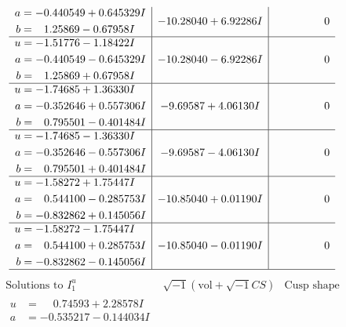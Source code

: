 \documentclass[1p]{elsarticle_modified}
\theoremstyle{definition}
\newcommand{\I}{\sqrt{-1}}
\begin{document}
$$\begin{array}{c|c|c}
\begin{aligned}
a &= -0.440549 + 0.645329 I \\
b &= \phantom{-}1.25869 - 0.67958 I\end{aligned}
 & -10.28040 + 6.92286 I & \phantom{-0.000000 } 0 \\ \hline\begin{aligned}
u &= -1.51776 - 1.18422 I \\
a &= -0.440549 - 0.645329 I \\
b &= \phantom{-}1.25869 + 0.67958 I\end{aligned}
 & -10.28040 - 6.92286 I & \phantom{-0.000000 } 0 \\ \hline\begin{aligned}
u &= -1.74685 + 1.36330 I \\
a &= -0.352646 + 0.557306 I \\
b &= \phantom{-}0.795501 - 0.401484 I\end{aligned}
 & -9.69587 + 4.06130 I & \phantom{-0.000000 } 0 \\ \hline\begin{aligned}
u &= -1.74685 - 1.36330 I \\
a &= -0.352646 - 0.557306 I \\
b &= \phantom{-}0.795501 + 0.401484 I\end{aligned}
 & -9.69587 - 4.06130 I & \phantom{-0.000000 } 0 \\ \hline\begin{aligned}
u &= -1.58272 + 1.75447 I \\
a &= \phantom{-}0.544100 - 0.285753 I \\
b &= -0.832862 + 0.145056 I\end{aligned}
 & -10.85040 + 0.01190 I & \phantom{-0.000000 } 0 \\ \hline\begin{aligned}
u &= -1.58272 - 1.75447 I \\
a &= \phantom{-}0.544100 + 0.285753 I \\
b &= -0.832862 - 0.145056 I\end{aligned}
 & -10.85040 - 0.01190 I & \phantom{-0.000000 } 0\\
 \hline 
 \end{array}$$\newpage$$\begin{array}{c|c|c}  
\text{Solutions to }I^u_{1}& \I (\text{vol} + \sqrt{-1}CS) & \text{Cusp shape}\\
 \hline 
\begin{aligned}
u &= \phantom{-}0.74593 + 2.28578 I \\
a &= -0.535217 - 0.144034 I \\

\end{aligned}
\end{array}$$
\end{document}
